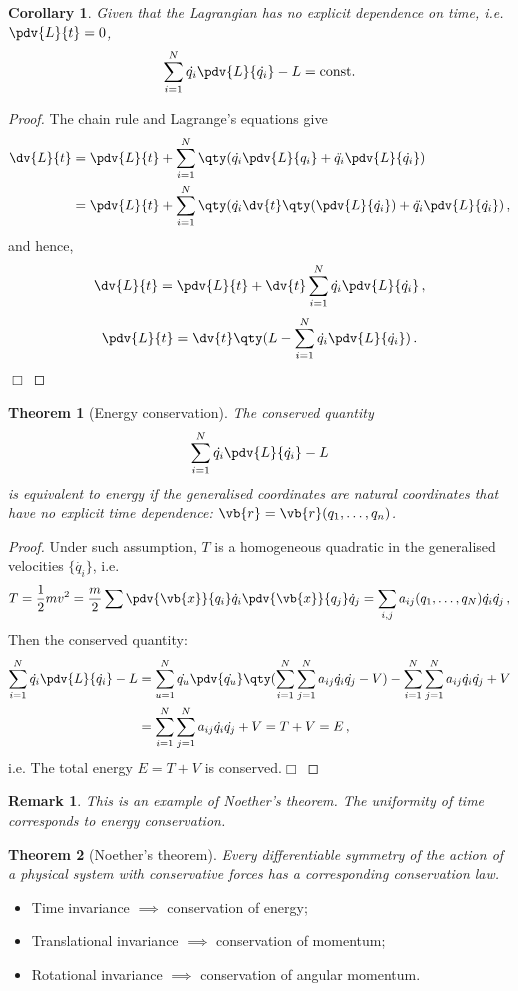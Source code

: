 \documentclass{article}
\theoremstyle{plain}\theoremheaderfont{\normalfont\itshape}\theorembodyfont{\rmfamily}\theoremseparator{.}\newtheorem*{rem}{Remark}\newtheorem*{ex}{Example}\newtheorem*{proof}{Proof}\newtheorem*{altp}{Alternative proof}
\theoremstyle{plain}\theoremheaderfont{\normalfont\bfseries}\theorembodyfont{\rmfamily}\theoremseparator{.}\newtheorem{thm}{Theorem}[section]\newtheorem{lem}[thm]{Lemma}\newtheorem{prop}[thm]{Proposition}\newtheorem*{cor}{Corollary}\newtheorem{defn}[thm]{Definition}\newtheorem{clm}[thm]{Claim}\newtheorem{clminproof}{Claim}
\theoremstyle{break}\theoremheaderfont{\normalfont\itshape}\theorembodyfont{\rmfamily}\theoremseparator{.\medskip}\newtheorem*{proofskip}{Proof}\newtheorem*{exs}{Examples}\newtheorem*{rems}{Remarks}
\theoremstyle{break}\theoremheaderfont{\normalfont\bfseries}\theorembodyfont{\rmfamily}\theoremseparator{.\medskip}\newtheorem{lemskip}[thm]{Lemma}\newtheorem{defnskip}[thm]{Definition}\newtheorem{propskip}[thm]{Proposition}\newtheorem{thmskip}[thm]{Theorem}
\numberwithin{equation}{section}
\newcommand{\qed}{\hfill\ensuremath{\Box}}
\begin{document}
	\begin{cor}
		Given that the Lagrangian has no explicit dependence on time, i.e. \(\pdv{L}{t}=0\),
		\[\sum_{i=1}^{N}\dot{q_i}\pdv{L}{\dot{q_i}}-L=\text{const.}\]
	\end{cor}
	\begin{proof}
		The chain rule and Lagrange's equations give
		\begin{align*}
			\dv{L}{t}&=\pdv{L}{t}+\sum_{i=1}^{N}\qty(\dot{q_i}\pdv{L}{q_i}+\ddot{q_i}\pdv{L}{\dot{q_i}})\\
			&=\pdv{L}{t}+\sum_{i=1}^{N}\qty(\dot{q_i}\dv{t}\qty(\pdv{L}{\dot{q_i}})+\ddot{q_i}\pdv{L}{\dot{q_i}})\,,
		\end{align*}
		and hence,
		\[\dv{L}{t}=\pdv{L}{t}+\dv{t}\sum_{i=1}^{N}\dot{q_i}\pdv{L}{\dot{q_i}}\,,\]
		\[\pdv{L}{t}=\dv{t}\qty(L-\sum_{i=1}^{N}\dot{q_i}\pdv{L}{\dot{q_i}})\,.\]\qed
	\end{proof}
	\begin{thm}[Energy conservation]
		The conserved quantity
		\[\sum_{i=1}^{N}\dot{q_i}\pdv{L}{\dot{q_i}}-L\]
		is equivalent to energy if the generalised coordinates are \textit{natural coordinates} that have no explicit time dependence: \(\vb{r}=\vb{r}(q_{1},\dots,q_{n})\).
	\end{thm}
	\begin{proof}
		Under such assumption, \(T\) is a homogeneous quadratic in the generalised velocities \(\{\dot{q_i}\}\), i.e.
		\[T=\frac{1}{2}mv^2=\frac{m}{2}\sum\pdv{\vb{x}}{q_i}\dot{q}_i\pdv{\vb{x}}{q_j}\dot{q}_j=\sum_{i,j}a_{ij}(q_1,\dots,q_N)\dot{q_i}\dot{q_j}\,,\]
		Then the conserved quantity:
		\begin{align*}
			\sum_{i=1}^{N}\dot{q_i}\pdv{L}{\dot{q_i}}-L&=\sum_{u=1}^{N}\dot{q_u}\pdv{\dot{q_u}}\qty(\sum_{i=1}^{N}\sum_{j=1}^{N}a_{ij}\dot{q_i}\dot{q_j}-V)-\sum_{i=1}^{N}\sum_{j=1}^{N}a_{ij}\dot{q_i}\dot{q_j}+V\\
			&=\sum_{i=1}^{N}\sum_{j=1}^{N}a_{ij}\dot{q_i}\dot{q_j}+V=T+V=E\,,
		\end{align*}
		i.e. The total energy \(E=T+V\) is conserved.\qed
	\end{proof}

	\begin{rem}
		This is an example of \textit{Noether's theorem}. The uniformity of time corresponds to energy conservation.
	\end{rem}
	\begin{thm}[Noether's theorem]
		
		Every differentiable symmetry of the action of a physical system with conservative forces has a corresponding conservation law.
	\end{thm}
	\begin{itemize}
		\item Time invariance \(\implies\) conservation of energy;
		\item Translational invariance \(\implies\) conservation of momentum;
		\item Rotational invariance \(\implies\) conservation of angular momentum.
	\end{itemize}
\end{document}
